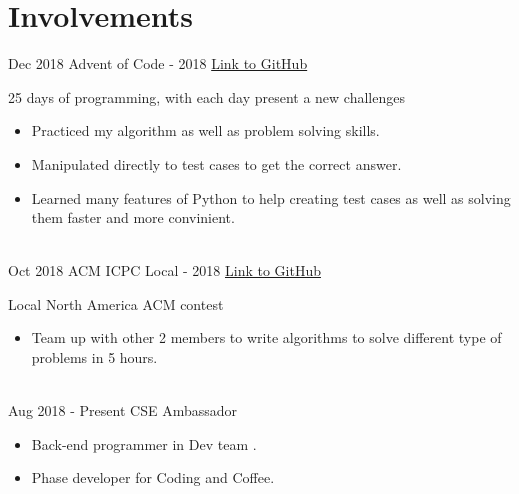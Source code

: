 \documentclass[letterpaper]{twentysecondcv} %
\begin{document}

\section{Involvements}
\begin{twenty}
	\twentyitem
    	{Dec 2018}
		{}
        {Advent of Code - 2018}
        {\href{https://github.com/HuyNVuong/AdventOfCode}{Link to GitHub}}
        {}
        {
        25 days of programming, with each day present a new challenges
        {\begin{itemize}
        \item Practiced my algorithm as well as problem solving skills.
        \item Manipulated directly to test cases to get the correct answer.
        \item Learned many features of Python to help creating test cases as well as solving them faster and more convinient.
		\end{itemize}}
        }
    \\
    \twentyitem
    	{Oct 2018}
		{}
        {ACM ICPC Local - 2018}
        {\href{https://github.com/HuyNVuong/ACM-2018}{Link to GitHub}}
        {}
        {
        Local North America ACM contest
        {\begin{itemize}
        \item Team up with other 2 members to write algorithms to solve different type of problems in 5 hours.
		\end{itemize}}
        }
    \\
    \twentyitem
    	{Aug 2018}
		{- Present}
        {CSE Ambassador}
        {}
        {}
        {
        {\begin{itemize}
        \item Back-end programmer in Dev team .
        \item Phase developer for Coding and Coffee.
		\end{itemize}}
        }
\end{twenty}

\end{document}
